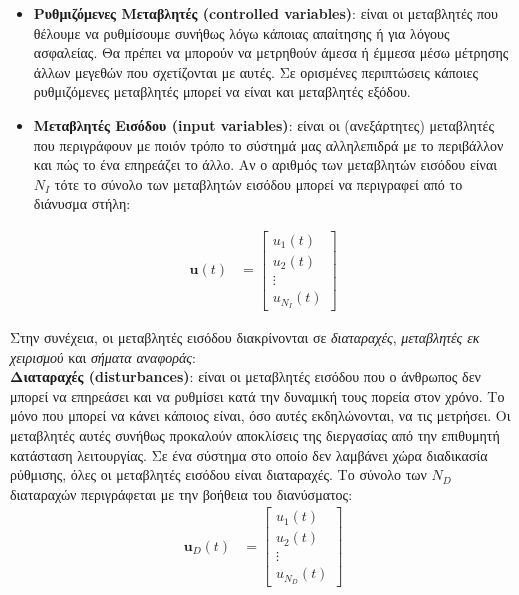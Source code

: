 \documentclass[11pt]{article} %
\numberwithin{equation}{subsection}
\begin{document}
\begin{itemize}
  \item \textbf{Ρυθμιζόμενες Μεταβλητές (controlled variables)}: είναι οι μεταβλητές που θέλουμε να ρυθμίσουμε συνήθως λόγω κάποιας απαίτησης ή για λόγους ασφαλείας. Θα πρέπει να μπορούν να μετρηθούν άμεσα ή έμμεσα μέσω μέτρησης άλλων μεγεθών που σχετίζονται με αυτές. Σε ορισμένες περιπτώσεις κάποιες ρυθμιζόμενες μεταβλητές μπορεί να είναι και μεταβλητές εξόδου.
  \item \textbf{Μεταβλητές Εισόδου (input variables)}: είναι οι (ανεξάρτητες) μεταβλητές που περιγράφουν με ποιόν τρόπο το σύστημά μας αλληλεπιδρά με το περιβάλλον και πώς το ένα επηρεάζει το άλλο. Αν ο αριθμός των μεταβλητών εισόδου είναι $N_I$ τότε το σύνολο των μεταβλητών εισόδου μπορεί να περιγραφεί από το διάνυσμα στήλη: 
\end{itemize}

 
\begin{align*}
\
\textbf{u}(t) &= \begin{bmatrix}
           u_{1}(t) \\
           u_{2}(t) \\
           \vdots \\
           u_{N_{I}}(t)
         \end{bmatrix}
\end{align*}

Στην συνέχεια, οι μεταβλητές εισόδου διακρίνονται σε \textit{διαταραχές}, \textit{μεταβλητές εκ χειρισμού} και \textit{σήματα αναφοράς}:\\

\textbf{Διαταραχές (disturbances)}: είναι οι μεταβλητές εισόδου που ο άνθρωπος δεν μπορεί να επηρεάσει και να ρυθμίσει κατά την δυναμική τους πορεία στον χρόνο. Το μόνο που μπορεί να κάνει κάποιος είναι, όσο αυτές εκδηλώνονται, να τις μετρήσει. Οι μεταβλητές αυτές συνήθως προκαλούν αποκλίσεις της διεργασίας από την επιθυμητή κατάσταση λειτουργίας. Σε ένα σύστημα στο οποίο δεν λαμβάνει χώρα διαδικασία ρύθμισης, όλες οι μεταβλητές εισόδου είναι διαταραχές. Το σύνολο των $Ν_D$ διαταραχών περιγράφεται με την βοήθεια του διανύσματος:
\begin{align*}
\
\textbf{u}_{D}(t) &= \begin{bmatrix}
           u_{1}(t) \\
           u_{2}(t) \\
           \vdots \\
           u_{N_{D}}(t)
         \end{bmatrix}
\end{align*}
\end{document}
